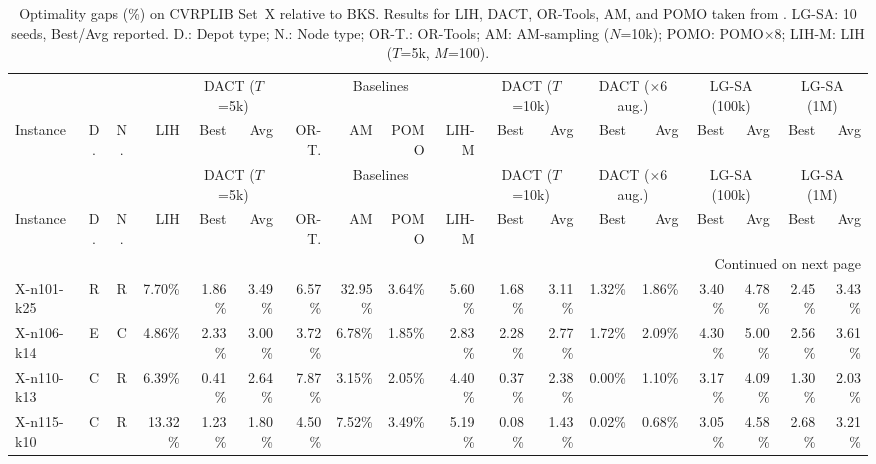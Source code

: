 \documentclass[letterpaper]{article} %
\begin{document}
\clearpage
\onecolumn
\begin{landscape}
\centering
\scriptsize
\setlength{\tabcolsep}{3pt}
\begin{longtable}{@{}l c c r rr rrrr rr rr rr rr@{}}
\caption{Optimality gaps (\%) on CVRPLIB Set~X \citep{uchoa_new_2017} relative to BKS. Results for LIH, DACT, OR-Tools, AM, and POMO taken from \citet{ma_learning_2021}. LG-SA: 10 seeds, Best/Avg reported. D.: Depot type; N.: Node type; OR-T.: OR-Tools; AM: AM-sampling ($N$=10k); POMO: POMO$\times$8; LIH-M: LIH ($T$=5k, $M$=100).}
\label{tab:uchoa_benchmark} \\
\toprule
& & & & \multicolumn{2}{c}{DACT ($T$=5k)} & \multicolumn{4}{c}{Baselines} & \multicolumn{2}{c}{DACT ($T$=10k)} & \multicolumn{2}{c}{DACT ($\times$6 aug.)} & \multicolumn{2}{c}{LG-SA (100k)} & \multicolumn{2}{c}{LG-SA (1M)} \\
\cmidrule(lr){5-6}\cmidrule(lr){7-10}\cmidrule(lr){11-12}\cmidrule(lr){13-14}\cmidrule(lr){15-16}\cmidrule(lr){17-18}
Instance & D. & N. & LIH & Best & Avg & OR-T. & AM & POMO & LIH-M & Best & Avg & Best & Avg & Best & Avg & Best & Avg \\
\midrule
\endfirsthead
\toprule
& & & & \multicolumn{2}{c}{DACT ($T$=5k)} & \multicolumn{4}{c}{Baselines} & \multicolumn{2}{c}{DACT ($T$=10k)} & \multicolumn{2}{c}{DACT ($\times$6 aug.)} & \multicolumn{2}{c}{LG-SA (100k)} & \multicolumn{2}{c}{LG-SA (1M)} \\
\cmidrule(lr){5-6}\cmidrule(lr){7-10}\cmidrule(lr){11-12}\cmidrule(lr){13-14}\cmidrule(lr){15-16}\cmidrule(lr){17-18}
Instance & D. & N. & LIH & Best & Avg & OR-T. & AM & POMO & LIH-M & Best & Avg & Best & Avg & Best & Avg & Best & Avg \\
\midrule
\endhead
\midrule
\multicolumn{18}{r}{Continued on next page} \\
\midrule
\endfoot
\bottomrule
\endlastfoot
X-n101-k25 & R & R & 7.70\% & 1.86\% & 3.49\% & 6.57\% & 32.95\% & 3.64\% & 5.60\% & 1.68\% & 3.11\% & 1.32\% & 1.86\% & 3.40\% & 4.78\% & 2.45\% & 3.43\% \\
X-n106-k14 & E & C & 4.86\% & 2.33\% & 3.00\% & 3.72\% & 6.78\% & 1.85\% & 2.83\% & 2.28\% & 2.77\% & 1.72\% & 2.09\% & 4.30\% & 5.00\% & 2.56\% & 3.61\% \\
X-n110-k13 & C & R & 6.39\% & 0.41\% & 2.64\% & 7.87\% & 3.15\% & 2.05\% & 4.40\% & 0.37\% & 2.38\% & 0.00\% & 1.10\% & 3.17\% & 4.09\% & 1.30\% & 2.03\% \\
X-n115-k10 & C & R & 13.32\% & 1.23\% & 1.80\% & 4.50\% & 7.52\% & 3.49\% & 5.19\% & 0.08\% & 1.43\% & 0.02\% & 0.68\% & 3.05\% & 4.58\% & 2.68\% & 3.21\% \\

\end{longtable}
\end{landscape}
\end{document}
